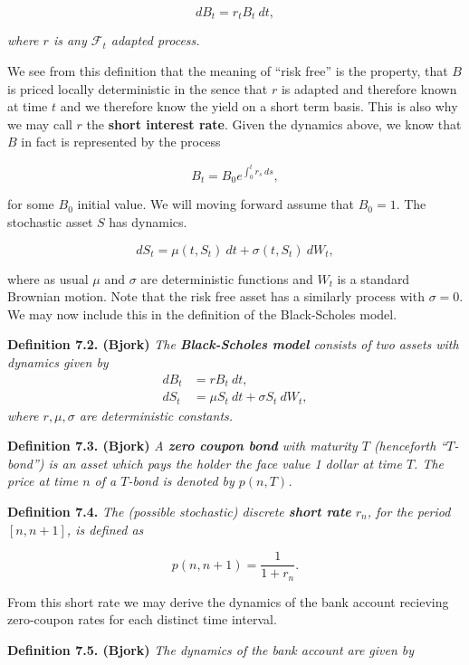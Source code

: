 \documentclass[a4paper,12pt,openany]{book}
\begin{document}
\[
dB_t=r_t B_t\ dt,\tag{7.1}
\]

\emph{where \(r\) is any \(\mathcal{F}_t\) adapted process.}

We see from this definition that the meaning of ``risk free'' is the property, that \(B\) is priced locally deterministic in the sence that \(r\) is adapted and therefore known at time \(t\) and we therefore know the yield on a short term basis. This is also why we may call \(r\) the \textbf{short interest rate}. Given the dynamics above, we know that \(B\) in fact is represented by the process

\[
B_t=B_0e^{\int_0^tr_s\ ds},
\]

for some \(B_0\) initial value. We will moving forward assume that \(B_0=1\). The stochastic asset \(S\) has dynamics.

\[
dS_t=\mu(t,S_t)\ dt + \sigma(t,S_t)\ dW_t,\tag{7.2}
\]

where as usual \(\mu\) and \(\sigma\) are deterministic functions and \(W_t\) is a standard Brownian motion. Note that the risk free asset has a similarly process with \(\sigma = 0\). We may now include this in the definition of the Black-Scholes model.

\textbf{Definition 7.2. (Bjork)} \emph{The \textbf{Black-Scholes model} consists of two assets with dynamics given by}
\begin{align*}
dB_t&=rB_t\ dt,\tag{7.3}\\
dS_t&=\mu S_t\ dt+\sigma S_t\ dW_t,\tag{7.4}
\end{align*}
\emph{where \(r,\mu,\sigma\) are deterministic constants.}

\textbf{Definition 7.3. (Bjork)} \emph{A \textbf{zero coupon bond} with maturity \(T\) (henceforth ``\(T\)-bond'') is an asset which pays the holder the face value 1 dollar at time \(T\). The price at time \(n\) of a \(T\)-bond is denoted by \(p(n,T)\).}

\textbf{Definition 7.4.} \emph{The (possible stochastic) discrete \textbf{short rate} \(r_n\), for the period \([n,n+1]\), is defined as}

\[
p(n,n+1)=\frac{1}{1+ r_n}.\tag{7.6}
\]

From this short rate we may derive the dynamics of the bank account recieving zero-coupon rates for each distinct time interval.

\textbf{Definition 7.5. (Bjork)} \emph{The dynamics of the bank account are given by}
\end{document}
